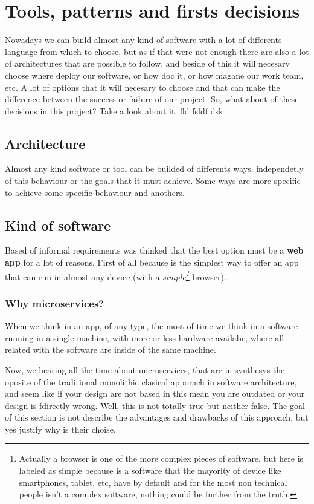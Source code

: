 
\chapter{Tools, patterns and firsts decisions}

Nowadays we can build almost any kind of software with a lot of differents
language from which to choose, but as if that were not enough there
are also a lot of architectures that are possible to follow, and beside
of this it will necesary choose where deploy our software, or how
doc it, or how magane our work team, etc. A lot of options that it
will necesary to choose and that can make the difference between the
success or failure of our project. So, what about of these decisions
in this project? Take a look about it.
fld fsldf dsk

\section{Architecture}

Almost any kind software or tool can be builded of differents ways, independetly
of this behaviour or the goals that it must achieve. Some ways are more specific
to achieve some specific behaviour and anothers.

\section{Kind of software}
Based of informal requirements was thinked that the best option must be a \textbf{web app} for a lot of reasons. First of all because is the simplest way to offer an app that can run in almost any device (with a \textit{simple\footnote{Actually a browser is one of the more complex pieces of software, but here is labeled as simple because is a software that the mayority of device like smartphones, tablet, etc, have by default and for the most non technical people isn't a complex software, nothing could be further from the truth.}} browser).

\subsection{Why microservices?}

When we think in an app, of any type, the most of time we think in a software
running in a single machine, with more or less hardware availabe, where all
related with the software are inside of the same machine.

Now, we hearing all the time about microservices, that are in synthesys the
oposite of the traditional monolithic clasical apporach in software architecture,
and seem like if your design are not based in this mean you are outdated or your
design is fdirectly wrong.
Well, this is not totally true but neither false. The goal of this section is
not describe the advantages and drawbacks of this approach, but yes justify why
is their choise.

